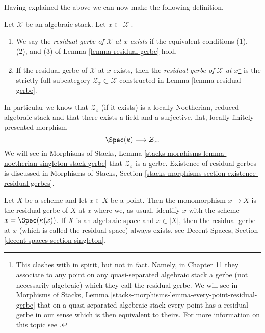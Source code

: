 \noindent
Having explained the above we can now make the following definition.

\begin{definition}
\label{definition-residual-gerbe}
Let $\mathcal{X}$ be an algebraic stack. Let $x \in |\mathcal{X}|$.
\begin{enumerate}
\item We say the {\it residual gerbe of $\mathcal{X}$ at $x$ exists}
if the equivalent conditions (1), (2), and (3) of
Lemma \ref{lemma-residual-gerbe}
hold.
\item If the residual gerbe of $\mathcal{X}$ at $x$ exists, then the
{\it residual gerbe of $\mathcal{X}$ at $x$}\footnote{This clashes with
\cite{LM-B} in spirit, but not in fact. Namely, in Chapter 11 they associate
to any point on any quasi-separated algebraic stack a gerbe (not necessarily
algebraic) which they call the residual gerbe. We will see in
Morphisms of Stacks, Lemma
\ref{stacks-morphisms-lemma-every-point-residual-gerbe}
that on a quasi-separated algebraic stack every point
has a residual gerbe in our sense which is then equivalent to theirs. For
more information on this topic see
\cite[Appendix B]{rydh_etale_devissage}.}
is the strictly full
subcategory $\mathcal{Z}_x \subset \mathcal{X}$ constructed in
Lemma \ref{lemma-residual-gerbe}.
\end{enumerate}
\end{definition}

\noindent
In particular we know that $\mathcal{Z}_x$ (if it exists) is a
locally Noetherian, reduced algebraic stack and that there exists a
field and a surjective, flat, locally finitely presented morphism
$$
\Spec(k) \longrightarrow \mathcal{Z}_x.
$$
We will see in
Morphisms of Stacks, Lemma
\ref{stacks-morphisms-lemma-noetherian-singleton-stack-gerbe}
that $\mathcal{Z}_x$ is a gerbe. Existence of residual gerbes is
discussed in Morphisms of Stacks, Section
\ref{stacks-morphisms-section-existence-residual-gerbes}.

\begin{example}
\label{example-residual-gerbe}
Let $X$ be a scheme and let $x \in X$ be a point. Then the monomorphism
$x \to X$ is the residual gerbe of $X$ at $x$ where we, as usual, identify
$x$ with the scheme $x = \Spec(\kappa(x))$. If $X$ is an algebraic space
and $x \in |X|$, then the residual gerbe at $x$ (which is called
the residual space) always exists, see
Decent Spaces, Section \ref{decent-spaces-section-singleton}.
\end{example}

